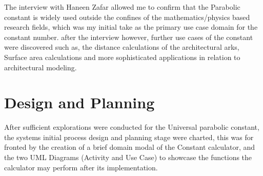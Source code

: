 \documentclass[12pt]{report}
\begin{document}
\begin{flushleft}
    The interview with Haneen Zafar allowed me to confirm that the Parabolic constant is widely used outside the confines of the mathematics/physics based research fields, which was my initial take as the primary use case domain for the constant number. after the interview however, further use cases of the constant were discovered such as, the distance calculations of the architectural arks, Surface area calculations and more sophisticated applications in relation to architectural modeling.  
    

\end{flushleft}


\chapter{Design and Planning}

After sufficient explorations were conducted for the Universal parabolic constant, the systems initial process design and planning stage were charted, this was for fronted by the creation of a brief domain modal of the Constant calculator, and the two UML Diagrams (Activity and Use Case) to showcase the functions the calculator may perform after its implementation.
\end{document}
